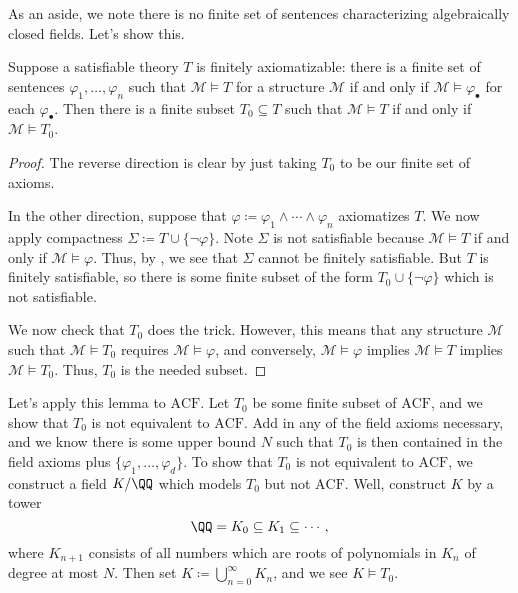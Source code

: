\documentclass[../notes.tex]{subfiles}
\begin{document}
As an aside, we note there is no finite set of sentences characterizing algebraically closed fields. Let's show this.
\begin{lemma} \label{lem:try-to-finitely-axiom}
	Suppose a satisfiable theory $T$ is finitely axiomatizable: there is a finite set of sentences $\varphi_1,\ldots,\varphi_n$ such that $\mathcal M\models T$ for a structure $\mathcal M$ if and only if $\mathcal M\models\varphi_\bullet$ for each $\varphi_\bullet$. Then there is a finite subset $T_0\subseteq T$ such that $\mathcal M\models T$ if and only if $\mathcal M\models T_0$.
\end{lemma}
\begin{proof}
	The reverse direction is clear by just taking $T_0$ to be our finite set of axioms.
	
	In the other direction, suppose that $\varphi\coloneqq\varphi_1\land\cdots\land\varphi_n$ axiomatizes $T$. We now apply compactness $\Sigma\coloneqq T\cup\{\lnot\varphi\}$. Note $\Sigma$ is not satisfiable because $\mathcal M\models T$ if and only if $\mathcal M\models\varphi$. Thus, by , we see that $\Sigma$ cannot be finitely satisfiable. But $T$ is finitely satisfiable, so there is some finite subset of the form $T_0\cup\{\lnot\varphi\}$ which is not satisfiable.
	
	We now check that $T_0$ does the trick. However, this means that any structure $\mathcal M$ such that $\mathcal M\models T_0$ requires $\mathcal M\models\varphi$, and conversely, $\mathcal M\models\varphi$ implies $\mathcal M\models T$ implies $\mathcal M\models T_0$. Thus, $T_0$ is the needed subset.
\end{proof}
Let's apply this lemma to $\mathrm{ACF}$. Let $T_0$ be some finite subset of $\mathrm{ACF}$, and we show that $T_0$ is not equivalent to $\mathrm{ACF}$. Add in any of the field axioms necessary, and we know there is some upper bound $N$ such that $T_0$ is then contained in the field axioms plus $\{\varphi_1,\ldots,\varphi_d\}$. To show that $T_0$ is not equivalent to $\mathrm{ACF}$, we construct a field $K/\QQ$ which models $T_0$ but not $\mathrm{ACF}$. Well, construct $K$ by a tower
\[\QQ=K_0\subseteq K_1\subseteq\cdots,\]
where $K_{n+1}$ consists of all numbers which are roots of polynomials in $K_n$ of degree at most $N$. Then set $K\coloneqq\bigcup_{n=0}^\infty K_n$, and we see $K\models T_0$.
\end{document}
